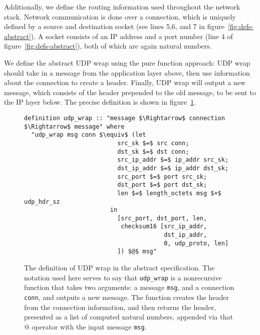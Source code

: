 \documentclass[twoside]{memoir}
\begin{document}
Additionally, we define the routing information used throughout the
network stack.
Network communication is done over a connection,
which is uniquely defined by a source and destination socket
(see lines 5,6, and 7 in figure~\ref{fig:defs-abstract}).
A socket consists of an IP address and a port number (line 4 of figure~\ref{fig:defs-abstract}), both of which are again natural numbers.

We define the abstract UDP wrap using the pure function approach:
UDP wrap should take in a message from the application layer above,
then use information about the connection to create a header.
Finally, UDP wrap will output a new message, which consists of the header
prepended to the old message, to be sent to the IP layer below.
The precise definition is shown in figure~\ref{fig:wrap-abstract}.

\begin{figure}[htpb]
    \centering
\begin{lstlisting}[language=isabelle]
definition udp_wrap :: "message $\Rightarrow$ connection $\Rightarrow$ message" where
  "udp_wrap msg conn $\equiv$ (let
                          src_sk $=$ src conn;
                          dst_sk $=$ dst conn;
                          src_ip_addr $=$ ip_addr src_sk;
                          dst_ip_addr $=$ ip_addr dst_sk;
                          src_port $=$ port src_sk;
                          dst_port $=$ port dst_sk;
                          len $=$ length_octets msg $+$ udp_hdr_sz
                        in
                          [src_port, dst_port, len,
                           checksum16 [src_ip_addr,
                                       dst_ip_addr,
                                       0, udp_proto, len]
                          ]) $@$ msg"
\end{lstlisting}
    \caption{The definition of UDP wrap in the abstract specification.
        The notation used here serves to say that \lstinline{udp_wrap}
        is a nonrecursive function that takes two arguments:
        a message \lstinline{msg}, and a connection \lstinline{conn},
        and outputs a new message.
        The function creates the header from the connection information,
        and then returns
        the header, presented as a list of computed natural numbers,
        appended via that $@$ operator with the input message
        \lstinline{msg}.
    }
    \label{fig:wrap-abstract}
\end{figure}
\end{document}

